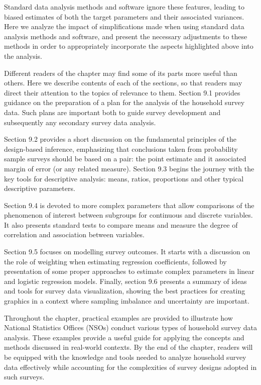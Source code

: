 \documentclass[
  12pt,
]{book}
\begin{document}
Standard data analysis methods and software ignore these features, leading to biased estimates of both the target parameters and their associated variances. Here we analyze the impact of simplifications made when using standard data analysis methods and software, and present the necessary adjustments to these methods in order to appropriately incorporate the aspects highlighted above into the analysis.

Different readers of the chapter may find some of its parts more useful than others. Here we describe contents of each of the sections, so that readers may direct their attention to the topics of relevance to them. Section 9.1 provides guidance on the preparation of a plan for the analysis of the household survey data. Such plans are important both to guide survey development and subsequently any secondary survey data analysis.

Section 9.2 provides a short discussion on the fundamental principles of the design-based inference, emphasizing that conclusions taken from probability sample surveys should be based on a pair: the point estimate and it associated margin of error (or any related measure). Section 9.3 begins the journey with the key tools for descriptive analysis: means, ratios, proportions and other typical descriptive parameters.

Section 9.4 is devoted to more complex parameters that allow comparisons of the phenomenon of interest between subgroups for continuous and discrete variables. It also presents standard tests to compare means and measure the degree of correlation and association between variables.

Section 9.5 focuses on modelling survey outcomes. It starts with a discussion on the role of weighting when estimating regression coefficients, followed by presentation of some proper approaches to estimate complex parameters in linear and logistic regression models. Finally, section 9.6 presents a summary of ideas and tools for survey data visualization, showing the best practices for creating graphics in a context where sampling imbalance and uncertainty are important.

Throughout the chapter, practical examples are provided to illustrate how National Statistics Offices (NSOs) conduct various types of household survey data analysis. These examples provide a useful guide for applying the concepts and methods discussed in real-world contexts. By the end of the chapter, readers will be equipped with the knowledge and tools needed to analyze household survey data effectively while accounting for the complexities of survey designs adopted in such surveys.
\end{document}
